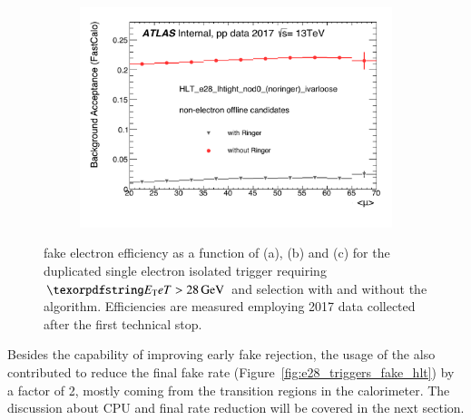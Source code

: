 \begin{figure}[h!tb]
\begin{center}
\begin{subfigure}[c]{.59\textwidth}
  \caption{}
  \end{subfigure}\\
  \begin{subfigure}[c]{.59\textwidth}
  \centering
  \includegraphics[width=\textwidth]{sections/04_operation/figures/efficiencies/eff_EGAM7_e28_ringer_and_noringer_2017_after_ts1_L2Calo_mu.pdf}
  \caption{}
  \end{subfigure}
  \caption{\label{fig:e28_triggers_fake} \fastcalo %
  fake electron efficiency as a function of \et (a), \eta (b) and \avgmu (c) for the
  duplicated single electron isolated trigger requiring $\et > \SI{28}{\GeV}$ and \tight
  selection with and without the \rnn{} algorithm. Efficiencies are measured
  employing 2017 data collected after the first technical stop.}%
  
  \end{center}
\end{figure}



Besides the capability of improving early fake rejection, the usage of the
\rnn{} also contributed to reduce the final fake rate
(Figure~\ref{fig:e28_triggers_fake_hlt}) by a factor of 2, mostly coming from
the transition regions in the calorimeter. The discussion about CPU and final rate reduction will be covered in the next section.


